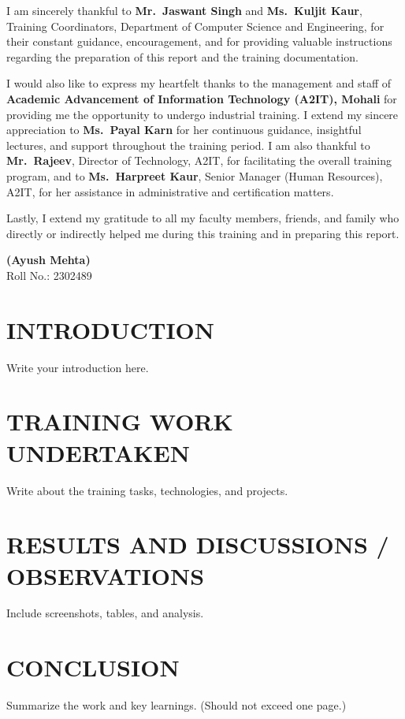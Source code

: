 \documentclass[a4paper,12pt,oneside]{report}
\numberwithin{equation}{chapter}
\numberwithin{figure}{chapter}
\numberwithin{table}{chapter}
\begin{document}
I am sincerely thankful to \textbf{Mr.~Jaswant Singh} and \textbf{Ms.~Kuljit Kaur}, Training Coordinators, Department of Computer Science and Engineering, for their constant guidance, encouragement, and for providing valuable instructions regarding the preparation of this report and the training documentation.

I would also like to express my heartfelt thanks to the management and staff of \textbf{Academic Advancement of Information Technology (A2IT), Mohali} for providing me the opportunity to undergo industrial training. I extend my sincere appreciation to \textbf{Ms.~Payal Karn} for her continuous guidance, insightful lectures, and support throughout the training period. I am also thankful to \textbf{Mr.~Rajeev}, Director of Technology, A2IT, for facilitating the overall training program, and to \textbf{Ms.~Harpreet Kaur}, Senior Manager (Human Resources), A2IT, for her assistance in administrative and certification matters.

Lastly, I extend my gratitude to all my faculty members, friends, and family who directly or indirectly helped me during this training and in preparing this report.

\vspace{10mm}
\noindent
\textbf{(Ayush Mehta)}\\
Roll No.: 2302489

\tableofcontents
\listoffigures
\listoftables

\chapter{INTRODUCTION}
Write your introduction here.

\chapter{TRAINING WORK UNDERTAKEN}
Write about the training tasks, technologies, and projects.

\chapter{RESULTS AND DISCUSSIONS / OBSERVATIONS}
Include screenshots, tables, and analysis.

\chapter{CONCLUSION}
Summarize the work and key learnings. (Should not exceed one page.)
\end{document}
